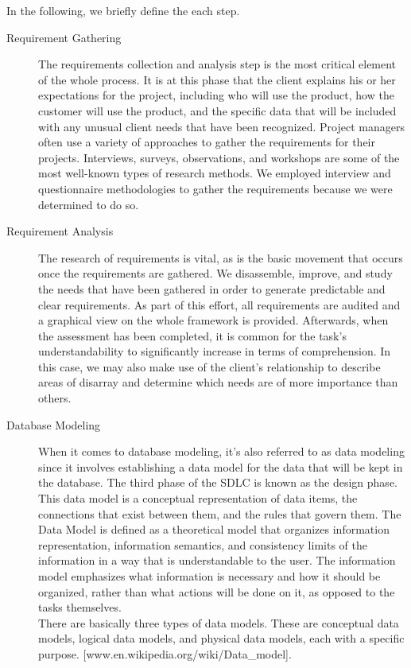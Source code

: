 In the following, we briefly define the each step.
\begin{description}
\item [Requirement Gathering] The requirements collection and analysis step is the most critical element of the whole process. It is at this phase that the client explains his or her expectations for the project, including who will use the product, how the customer will use the product, and the specific data that will be included with any unusual client needs that have been recognized. Project managers often use a variety of approaches to gather the requirements for their projects. Interviews, surveys, observations, and workshops are some of the most well-known types of research methods. We employed interview and questionnaire methodologies to gather the requirements because we were determined to do so.
\item[Requirement Analysis] The research of requirements is vital, as is the basic movement that occurs once the requirements are gathered. We disassemble, improve, and study the needs that have been gathered in order to generate predictable and clear requirements. As part of this effort, all requirements are audited and a graphical view on the whole framework is provided. Afterwards, when the assessment has been completed, it is common for the task's understandability to significantly increase in terms of comprehension. In this case, we may also make use of the client's relationship to describe areas of disarray and determine which needs are of more importance than others.
\item[Database Modeling] When it comes to database modeling, it's also referred to as data modeling since it involves establishing a data model for the data that will be kept in the database. The third phase of the SDLC is known as the design phase. This data model is a conceptual representation of data items, the connections that exist between them, and the rules that govern them. The Data Model is defined as a theoretical model that organizes information representation, information semantics, and consistency limits of the information in a way that is understandable to the user. The information model emphasizes what information is necessary and how it should be organized, rather than what actions will be done on it, as opposed to the tasks themselves.\\

There are basically three types of data models. These are conceptual data models, logical data models, and physical data models,  each with a specific purpose. [www.en.wikipedia.org/wiki/Data\_model].\\


\end{description}

